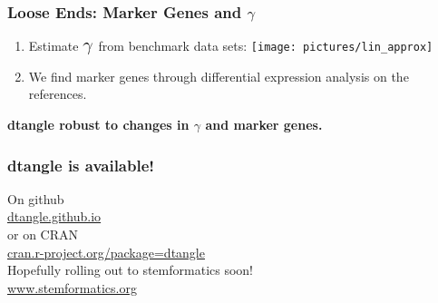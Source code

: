 \documentclass[usenames,dvipsnames,15pt]{beamer}
\newcommand{\crb}{\color{RoyalBlue}}
\newcommand{\cbr}{\color{BrickRed}}
\newcommand{\tn}{\text{\Large $\theta$}_{\cbr g}}
\newcommand{\slope}{\text{\Large $\gamma$}}
\begin{document}
\begin{frame}
  \frametitle{Loose Ends: Marker Genes and $\gamma$}
  \begin{enumerate}
  \item Estimate $\slope$ from \alert{benchmark data sets}:
    \hspace*{2cm}\texttt{[image: pictures/lin\_approx]}
  \item We find \alert{marker genes} through \alert{differential expression analysis} on the references.
  \end{enumerate}
  {\bf dtangle robust to changes in $\gamma$ and marker genes.}
\end{frame}

\begin{frame}
  \frametitle{dtangle is available!}
{\Large
  \begin{center}
    On github\\
    \alert{\url{dtangle.github.io}}\\
    or on CRAN\\
    \alert{\url{cran.r-project.org/package=dtangle}}\\\vspace{1cm}
      Hopefully rolling out to stemformatics soon!\\
  \alert{\url{www.stemformatics.org}}
  \end{center}
}
\end{frame}

%  
\end{document}

